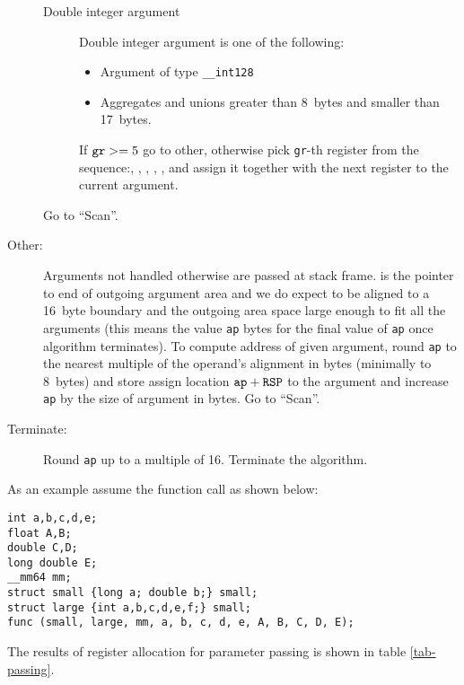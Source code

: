 \begin{description}
\begin{description}
    \item[Double integer argument]
      Double integer argument is one of the following:
      \begin{itemize}
        \item Argument of type \verb|__int128|
        \item Aggregates and unions greater than 8~bytes and smaller than 17~bytes.
      \end{itemize}
      If $\verb|gr| >= 5$ go to other, otherwise pick \verb|gr|-th register from
      the sequence:\RAX, \RDX, \RCX, \RBX, \RSI, \RDI{} and assign it together with the
      next register to the current argument.
   \end{description}
   Go to ``Scan''.

  \item[Other:]

    Arguments not handled otherwise are passed at stack frame. \RSP{} is the
    pointer to end of outgoing argument area and we do expect \RSP{} to be
    aligned to a 16~byte boundary and the outgoing area space large enough to fit all
    the arguments (this means the value \verb|ap| bytes for the final value of
    \verb|ap| once algorithm terminates).  To compute address of given argument,
    round \verb|ap| to the nearest multiple of the operand's alignment in bytes
    (minimally to 8~bytes) and
    store assign location $\verb|ap|+\RSP$ to the argument and increase \verb|ap| by
    the size of argument in bytes.
    Go to ``Scan''.

  \item[Terminate:]
    Round \verb|ap| up to a multiple of 16. Terminate the algorithm.
\end{description}

As an example assume the function call as shown below:

\begin{verbatim}
int a,b,c,d,e;
float A,B;
double C,D;
long double E;
__mm64 mm;
struct small {long a; double b;} small;
struct large {int a,b,c,d,e,f;} small;
func (small, large, mm, a, b, c, d, e, A, B, C, D, E);
\end{verbatim}

The results of register allocation for parameter passing is shown in table \ref{tab-passing}.

